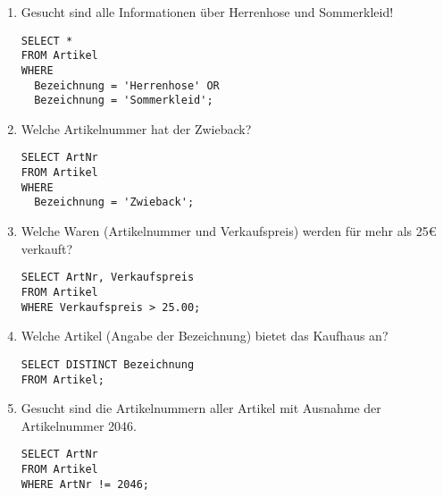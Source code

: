\documentclass{lehramt-informatik-haupt}
\begin{document}
\renewcommand{\labelenumi}{(\alph{enumi})}
\begin{enumerate}


\item Gesucht sind alle Informationen über Herrenhose und Sommerkleid!

\begin{antwort}[muster]
\begin{verbatim}
SELECT *
FROM Artikel
WHERE
  Bezeichnung = 'Herrenhose' OR
  Bezeichnung = 'Sommerkleid';
\end{verbatim}
\end{antwort}


\item Welche Artikelnummer hat der Zwieback?

\begin{antwort}[muster]
\begin{verbatim}
SELECT ArtNr
FROM Artikel
WHERE
  Bezeichnung = 'Zwieback';
\end{verbatim}
\end{antwort}


\item Welche Waren (Artikelnummer und Verkaufspreis) werden für mehr als
25€ verkauft?

\begin{antwort}[muster]
\begin{verbatim}
SELECT ArtNr, Verkaufspreis
FROM Artikel
WHERE Verkaufspreis > 25.00;
\end{verbatim}
\end{antwort}


\item Welche Artikel (Angabe der Bezeichnung) bietet das Kaufhaus an?

\begin{antwort}[muster]
\begin{verbatim}
SELECT DISTINCT Bezeichnung
FROM Artikel;
\end{verbatim}
\end{antwort}


\item Gesucht sind die Artikelnummern aller Artikel mit Ausnahme der
Artikelnummer 2046.

\begin{antwort}[richtig]
\begin{verbatim}
SELECT ArtNr
FROM Artikel
WHERE ArtNr != 2046;
\end{verbatim}
\end{antwort}


\end{enumerate}
\end{document}
